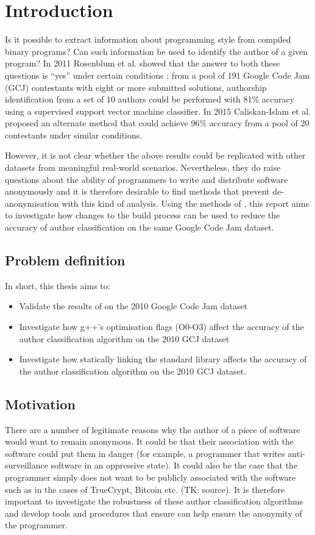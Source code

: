 \documentclass[a4paper,11pt]{kth-mag}
\begin{document}
\chapter{Introduction}
Is it possible to extract information about programming style from compiled
binary programs? Can such information be used to identify the author of a given
program? In 2011 Rosenblum et al. showed that the answer to both these
questions is “yes” under certain conditions \parencite{rosenblum2011wrote};
from a pool of 191 Google Code Jam (GCJ) contestants with eight or more
submitted solutions, authorship identification from a set of 10 authors could
be performed with 81\% accuracy using a supervised support vector machine
classifier. In 2015 Caliskan-Islam et al. proposed an alternate method that
could achieve 96\% accuracy from a pool of 20 contestants
\parencite{caliskan2015coding} under similar conditions.

However, it is not clear whether the above results could be replicated with
other datasets from meaningful real-world scenarios. Nevertheless, they do
raise questions about the ability of programmers to write and distribute
software anonymously and it is therefore desirable to find methods that prevent
de-anonymisation with this kind of analysis. Using the methods of
\parencite{rosenblum2011wrote}, this report aims to investigate how changes to
the build process can be used to reduce the accuracy of author classification
on the same Google Code Jam dataset.

\section{Problem definition} In short, this thesis aims to:
\begin{itemize}
\item Validate the results of \parencite{rosenblum2011wrote} on the 2010 Google
      Code Jam dataset
\item Investigate how g++’s optimisation flags (O0-O3) affect the accuracy of
      the author classification algorithm on the 2010 GCJ dataset
\item Investigate how statically linking the standard library affects the
      accuracy of the author classification algorithm on the 2010 GCJ dataset.
\end{itemize}

\section{Motivation}
There are a number of legitimate reasons why the author of a piece of software
would want to remain anonymous. It could be that their association with the
software could put them in danger (for example, a programmer that writes
anti-surveillance software in an oppressive state). It could also be the case
that the programmer simply does not want to be publicly associated with the
software such as in the cases of TrueCrypt, Bitcoin etc. (TK: source). It is
therefore important to investigate the robustness of these author
classification algorithms and develop tools and procedures that ensure can help
ensure the anonymity of the programmer.
\end{document}
